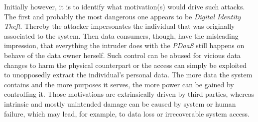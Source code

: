 \documentclass[12pt,english,a4paper,titlepage,cleardoublepage=empty,dottedtoc]{report}
\begin{document}
Initially however, it is to identify what motivation(s) would drive such
attacks. The first and probably the most dangerous one appears to be
\emph{Digital Identity Theft}. Thereby the attacker impersonates the
individual that was originally associated to the system. Then data
consumers, though, have the misleading impression, that everything the
intruder does with the \emph{PDaaS} still happens on behave of the data
owner herself. Such control can be abused for vicious data changes to
harm the physical counterpart or the access can simply be exploited to
unopposedly extract the individual's personal data. The more data the
system contains and the more purposes it serves, the more power can be
gained by controlling it. Those motivations are extrinsically driven by
third parties, whereas intrinsic and mostly unintended damage can be
caused by system or human failure, which may lead, for example, to data
loss or irrecoverable system access.
\end{document}
